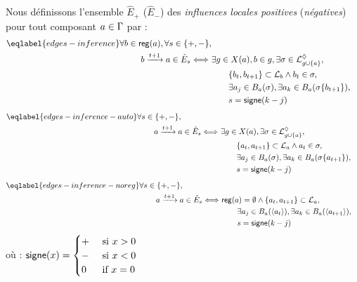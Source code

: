\begin{proposition}
  Nous définissons l'ensemble $\hat{E}_+$ (\resp $\hat{E}_-$)
  des \emph{influences locales positives} (\resp \emph{négatives})
  pour tout composant $a \in \mathrm{\Gamma}$ par :
  \begin{align}
    \begin{split}\eqlabel{edges-inference}
      \forall b \in \reg(a), \forall s \in \{ +, - \}, \\
      b \xrightarrow{t+1} a \in \hat{E}_s \Longleftrightarrow\ & \exists g \in X(a), b \in g,
      \exists \sigma \in \PHsubl_{g \cup \{ a \}}, \\
        &\qquad \{ b_t, b_{t+1} \} \subset \PHl_b \wedge b_t \in \sigma,\\
        &\qquad \exists a_j \in \irB_a(\sigma), \exists a_k \in \irB_a(\sigma\{b_{t+1}\}), \\
        &\qquad s = \f{signe}(k - j)
    \end{split}
    \end{align}
    \begin{align}
    \begin{split}\eqlabel{edges-inference-auto}
      \forall s \in \{ +, - \}, \quad\qquad\qquad \\
      a \xrightarrow{t+1} a \in \hat{E}_s \Longleftrightarrow\ & \exists g \in X(a),
      \exists \sigma \in \PHsubl_{g \cup \{ a \}}, \\
        &\qquad \{ a_t, a_{t+1} \} \subset \PHl_a \wedge a_t \in \sigma,\\
        &\qquad \exists a_j \in \irB_a(\sigma), \exists a_k \in \irB_a(\sigma\{a_{t+1}\}), \\
        &\qquad s = \f{signe}(k - j)
    \end{split}
    \end{align}
    \begin{align}
    \begin{split}\eqlabel{edges-inference-noreg}
      \forall s \in \{ +, - \}, \quad\qquad\qquad \\
      a \xrightarrow{t+1} a \in \hat{E}_s \Longleftrightarrow\ & \reg(a) = \emptyset \wedge
        \{ a_t, a_{t+1} \} \subset \PHl_a, \\
        &\qquad \exists a_j \in \irB_a(\etat{a_t}), \exists a_k \in \irB_a(\etat{a_{t+1}}), \\
        &\qquad s = \f{signe}(k - j)
    \end{split}
  \end{align}
  où : $\mathsf{signe}(x) = \begin{cases}
    + & \text{ si $x > 0$} \\
    - & \text{ si $x < 0$} \\
    0 & \text{ if $x = 0$}
  \end{cases}$
\end{proposition}


